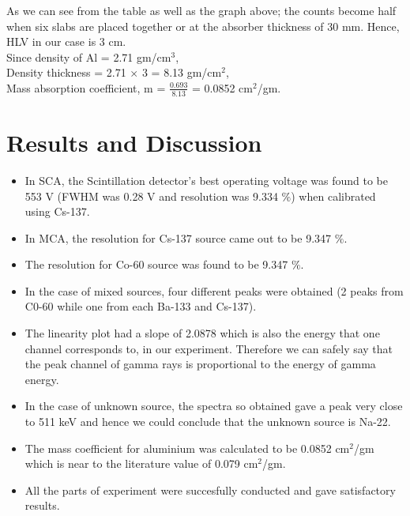 \documentclass[%
 reprint,
nofootinbib,
 amsmath,amssymb,
 aps,
floatfix,
]{revtex4-2}
\begin{document}
As we can see from the table as well as the graph above; the counts become half when six slabs are placed together or at the absorber thickness of 30 mm. Hence, HLV in our case is 3 cm. \\
Since density of Al = 2.71 gm/cm$^3$,\\
Density thickness = 2.71 $\times$ 3 = 8.13 gm/cm$^2$,\\
Mass absorption coefficient, m = $\frac{0.693}{8.13}$ = 0.0852 cm$^2$/gm.
    


\section{Results and Discussion}
\begin{itemize}
    \item In SCA, the Scintillation detector's best operating voltage was found to be 553 V (FWHM was 0.28 V and resolution was 9.334 $\%$) when calibrated using Cs-137.
    \item In MCA, the resolution for Cs-137 source came out to be 9.347 $\%$.
    \item The resolution for Co-60 source was found to be 9.347 $\%$.
    \item In the case of mixed sources, four different peaks were obtained (2 peaks from C0-60 while one from each Ba-133 and Cs-137).
    \item The linearity plot had a slope of 2.0878 which is also the energy that one channel corresponds to, in our experiment. Therefore we can safely say that the peak channel of gamma rays is proportional to the energy of gamma energy.
    \item In the case of unknown source, the spectra so obtained gave a peak very close to 511 keV and hence we could conclude that the unknown source is Na-22.
    \item The mass coefficient for aluminium was calculated to be 0.0852 cm$^2$/gm which is near to the literature value of 0.079 cm$^2$/gm.
    \item All the parts of experiment were succesfully conducted and gave satisfactory results.
\end{itemize}
\end{document}
